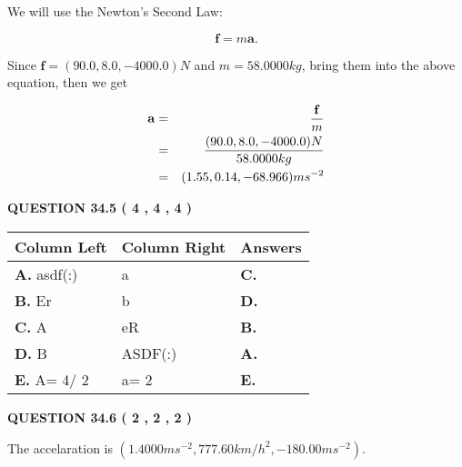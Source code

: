 \documentclass[12pt]{article}
\begin{document}
We will use the Newton's Second Law:
 
\[
\mathbf{f}=m\mathbf{a}.
\]
 
Since $\mathbf{f}= %
(90.0 , 8.0 , -4000.0) N$
and $m= %
58.0000kg$, bring them into the above equation, then we get
 
\begin{eqnarray*}
\mathbf{a}&=&\frac{\mathbf{f}}m  \\
&=&\frac{ %
(90.0 , 8.0 , -4000.0) N}{ %
58.0000kg}  \\
&=& %
(1.55 , 0.14 , -68.966) ms^{-2}
\end{eqnarray*}
 
 
 
  
\vspace{0.2in}
  
{\textbf{\Large{QUESTION
34.5 
 (           4 ,           4 ,           4 )
}}}
  
  
 
 
\noindent{}
  
  
\begin{tabular}{|l|l|l|}
 \hline
 Column Left & Column Right  & Answers       \\ 
 \hline
{\textbf{\large{
A.}}}
asdf(:)
  & 
a
 & 
{\textbf{\large{
C.}}}
 \\ 
 \hline
{\textbf{\large{
B.}}}
Er
  & 
b
 & 
{\textbf{\large{
D.}}}
 \\ 
 \hline
{\textbf{\large{
C.}}}
A
  & 
eR
 & 
{\textbf{\large{
B.}}}
 \\ 
 \hline
{\textbf{\large{
D.}}}
B
  & 
ASDF(:)
 & 
{\textbf{\large{
A.}}}
 \\ 
 \hline
{\textbf{\large{
E.}}}
 A= %
4/ %
2

  & 
 a= %
2
 & 
{\textbf{\large{
E.}}}
 \\ 
 \hline
 \end{tabular}
  
  
 
 
 
 
  
\vspace{0.2in}
  
{\textbf{\Large{QUESTION
34.6 
 (           2 ,           2 ,           2 )
}}}
  
  
 
 
\noindent{}
 
 
The accelaration is
$(
1.4000ms^{-2},
777.60km/h^2,
-180.00ms^{-2}
).
$
 
\end{document}
